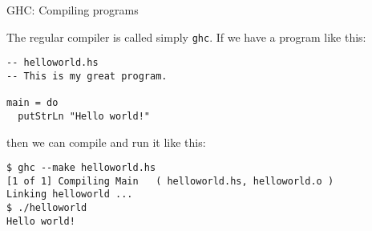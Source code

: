 %
\begin{frame}[fragile]{GHC: Compiling programs}

The regular compiler is called simply \texttt{ghc}. If we have a program like
this:

\begin{verbatim}
-- helloworld.hs
-- This is my great program.

main = do
  putStrLn "Hello world!"
\end{verbatim}

then we can compile and run it like this:

\begin{verbatim}
$ ghc --make helloworld.hs 
[1 of 1] Compiling Main   ( helloworld.hs, helloworld.o )
Linking helloworld ...
$ ./helloworld 
Hello world!
\end{verbatim}

\end{frame}
